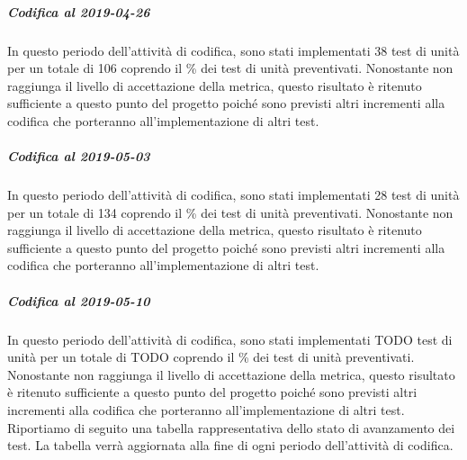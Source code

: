 \subparagraph{Codifica al 2019-04-26}
In questo periodo dell'attività di codifica, sono stati implementati 38 test di unità per un totale di 106 coprendo il \% dei test di unità preventivati.
Nonostante non raggiunga il livello di accettazione della
metrica, questo risultato è ritenuto sufficiente a questo punto del progetto poiché sono previsti altri incrementi alla codifica che porteranno all'implementazione di altri test.

\subparagraph{Codifica al 2019-05-03}
In questo periodo dell'attività di codifica, sono stati implementati 28 test di unità per un totale di 134 coprendo il \% dei test di unità preventivati.
Nonostante non raggiunga il livello di accettazione della
metrica, questo risultato è ritenuto sufficiente a questo punto del progetto poiché sono previsti altri incrementi alla codifica che porteranno all'implementazione di altri test.

\subparagraph{Codifica al 2019-05-10}
In questo periodo dell'attività di codifica, sono stati implementati TODO test di unità per un totale di TODO coprendo il \% dei test di unità preventivati.
Nonostante non raggiunga il livello di accettazione della
metrica, questo risultato è ritenuto sufficiente a questo punto del progetto poiché sono previsti altri incrementi alla codifica che porteranno all'implementazione di altri test.
\\Riportiamo di seguito una tabella rappresentativa dello stato di avanzamento dei test. La tabella verrà aggiornata alla fine di ogni periodo dell'attività di codifica.

